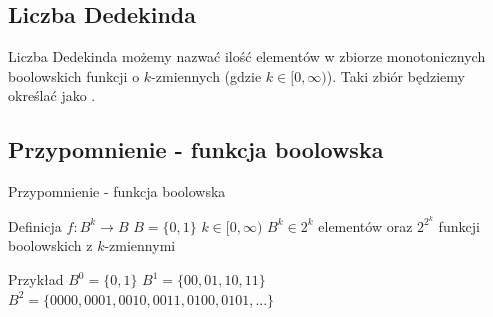 \documentclass{if-beamer}
\begin{document}
\subsection{Liczba Dedekinda}
\begin{frame}{Liczba Dedekinda}
\textbf{} możemy nazwać ilość elementów w zbiorze monotonicznych boolowskich funkcji o $k$-zmiennych (gdzie $ k \in [0, \infty) $). Taki zbiór będziemy określać jako \textbf{}.
\end{frame}

\subsection{Przypomnienie - funkcja boolowska}
\begin{frame}{Przypomnienie - funkcja boolowska}

\begin{block}{Definicja}
\centering
$ f: B^{k} \rightarrow B$
\linebreak
$ B = \lbrace 0, 1 \rbrace $
\linebreak
$ k \in [0,\infty) $
\linebreak\linebreak
$B^{k} \in 2^{k}$ elementów oraz $2^{2^{k}}$ funkcji boolowskich z $k$-zmiennymi
\end{block}

\begin{block}{Przykład}
\centering
$B^{0} = \lbrace 0, 1 \rbrace$
\linebreak
$B^{1} = \lbrace 00, 01, 10, 11 \rbrace$
\linebreak
$B^{2} = \lbrace 0000, 0001, 0010, 0011, 0100, 0101, ... \rbrace$
\end{block}
\end{frame}
\end{document}

